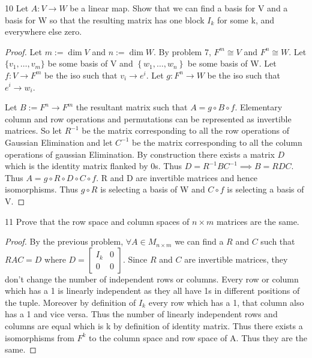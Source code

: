 \documentclass{article}
\begin{document}
\bigskip

\begin{claim}{10}\label{Claim 10.}
    Let $A: V \to W$ be a linear map. Show that we can find a basis for V and a basis for W so that the resulting matrix has one block $I_k$ for some k, and everywhere else zero.
\end{claim}
\begin{proof}
    Let $m := \dim V$ and $n := \dim W$. By problem 7, $F^m \cong V$ and $F^n \cong W$. Let $\{v_1, \dots, v_m\}$ be some basis of V and $\left\{w_1, \dots, w_n\right\}$ be some basis of W. Let $f: V \to F^m$ be the iso such that $v_i \to e^i$. Let $g: F^n \to W$ be the iso such that $e^i \to w_i$.
    
    Let $B := F^n \to F^m$ the resultant matrix such that $A = g \circ B \circ f$. Elementary column and row operations and permutations can be represented as invertible matrices. So let $R^{-1}$ be the matrix corresponding to all the row operations of Gaussian Elimination and let $C^{-1}$ be the matrix corresponding to all the column operations of gaussian Elimination. By construction there exists a matrix $D$ which is the identity matrix flanked by 0s. Thus $D = R^{-1}BC^{-1} \implies B = RDC$. Thus $A = g \circ R \circ D \circ C \circ f$. R and D are invertible matrices and hence isomorphisms. Thus $g \circ R$ is selecting a basis of W and $C \circ f$ is selecting a basis of V.
\end{proof}

\bigskip

\begin{claim}{11}\label{Claim 11.}
    Prove that the row space and column spaces of $n \times m$ matrices are the same. 
\end{claim}
\begin{proof}
    By the previous problem, $\forall A \in M_{n \times m}$ we can find a $R$ and $C$ such that $RAC = D$ where $D = \begin{bmatrix}
        I_k & 0\\0 & 0
    \end{bmatrix}$. Since $R$ and $C$ are invertible matrices, they don't change the number of independent rows or columns. Every row or column which has a 1 is linearly independent as they all have 1s in different positions of the tuple. Moreover by definition of $I_k$ every row which has a 1, that column also has a 1 and vice versa. Thus the number of linearly independent rows and columns are equal which is k by definition of identity matrix. Thus there exists a isomorphisms from $F^k$ to the column space and row space of A. Thus they are the same.
\end{proof}
\end{document}
